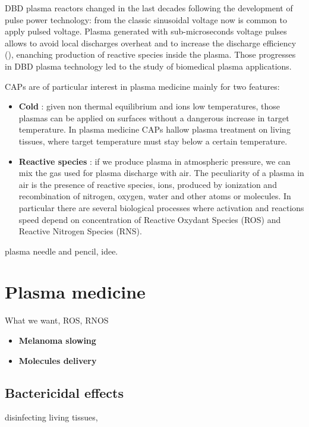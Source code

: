 DBD plasma reactors changed in the last decades following the development of pulse power technology: from the classic sinusoidal voltage now is common to apply pulsed voltage. Plasma generated with sub-microseconds voltage pulses allows to avoid local discharges overheat and to increase the discharge efficiency (\cite{ref:SHAO2009215}), enanching production of reactive species inside the plasma. Those progresses in DBD plasma technology led to the study of biomedical plasma applications.

CAPs are of particular interest in plasma medicine mainly for two features:
\begin{itemize}
 \item \textbf{Cold} : given non thermal equilibrium and ions low temperatures, those plasmas can be applied on surfaces without a dangerous increase in target temperature. In plasma medicine CAPs hallow plasma treatment on living tissues, where target temperature must stay below a certain temperature.
 \item \textbf{Reactive species} : if we produce plasma in atmospheric pressure, we can mix the gas used for plasma discharge with air. The peculiarity of a plasma in air is the presence of reactive species, ions, produced by ionization and recombination of nitrogen, oxygen, water and other atoms or molecules. In particular there are several biological processes where activation and reactions speed depend on concentration of Reactive Oxydant Species (ROS) and Reactive Nitrogen Species (RNS).
\end{itemize}

plasma needle and pencil, idee.


\section{Plasma medicine}
What we want, ROS, RNOS

\begin{itemize}
 \item \textbf{Melanoma slowing}
 \item \textbf{Molecules delivery}
\end{itemize}




\subsection{Bactericidal effects}
disinfecting living tissues, 


